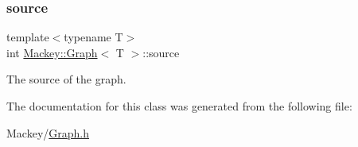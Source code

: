 \subsubsection{\texorpdfstring{source}{source}}
{\footnotesize\ttfamily template$<$typename T$>$ \\
int \hyperlink{classMackey_1_1Graph}{Mackey\+::\+Graph}$<$ T $>$\+::source\hspace{0.3cm}{\ttfamily [protected]}}



The source of the graph. 



The documentation for this class was generated from the following file\+:\begin{DoxyCompactItemize}
\item 
Mackey/\hyperlink{Graph_8h}{Graph.\+h}\end{DoxyCompactItemize}
